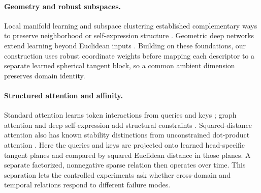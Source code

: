 \paragraph{Geometry and robust subspaces.}
Local manifold learning and subspace clustering established complementary ways to preserve neighborhood or self-expression structure \citep{roweis2000lle,tenenbaum2000isomap,elhamifar2013ssc,liu2013lrr}. Geometric deep networks extend learning beyond Euclidean inputs \citep{bronstein2017gdl,chakraborty2022manifoldnet}. Building on these foundations, our construction uses robust coordinate weights before mapping each descriptor to a separate learned spherical tangent block, so a common ambient dimension preserves domain identity.

\paragraph{Structured attention and affinity.}
Standard attention learns token interactions from queries and keys \citep{vaswani2017attention}; graph attention and deep self-expression add structural constraints \citep{velickovic2018gat,ji2017dsc}. Squared-distance attention also has known stability distinctions from unconstrained dot-product attention \citep{kim2021lipschitz}. Here the queries and keys are projected onto learned head-specific tangent planes and compared by squared Euclidean distance in those planes. A separate factorized, nonnegative sparse relation then operates over time. This separation lets the controlled experiments ask whether cross-domain and temporal relations respond to different failure modes.
